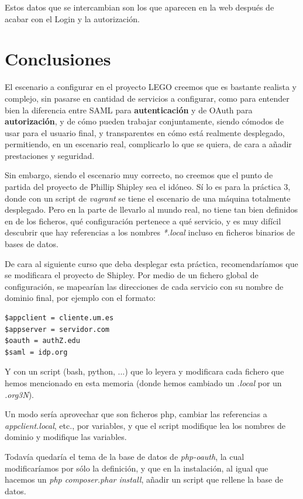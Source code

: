 \documentclass[]{article}
\begin{document}
Estos datos que se intercambian son los que aparecen en la web después de acabar con el Login y la autorización.

\section{Conclusiones}

El escenario a configurar en el proyecto LEGO creemos que es bastante realista y complejo, sin pasarse en cantidad de servicios a configurar, como para entender bien la diferencia entre SAML para \textbf{autenticación} y de OAuth para \textbf{autorización}, y de cómo pueden trabajar conjuntamente, siendo cómodos de usar para el usuario final, y transparentes en cómo está realmente desplegado, permitiendo, en un escenario real, complicarlo lo que se quiera, de cara a añadir prestaciones y seguridad.

\hfill

Sin embargo, siendo el escenario muy correcto, no creemos que el punto de partida del proyecto de Phillip Shipley sea el idóneo. Sí lo es para la práctica 3, donde con un script de \textit{vagrant} se tiene el escenario de una máquina totalmente desplegado. Pero en la parte de llevarlo al mundo real, no tiene tan bien definidos en de los ficheros, qué configuración pertenece a qué servicio, y es muy difícil descubrir que hay referencias a los nombres \textit{*.local} incluso en ficheros binarios de bases de datos.

\hfill

De cara al siguiente curso que deba desplegar esta práctica, recomendaríamos que se modificara el proyecto de Shipley. Por medio de un fichero global de configuración, se mapearían las direcciones de cada servicio con su nombre de dominio final, por ejemplo con el formato:

\begin{verbatim}
$appclient = cliente.um.es
$appserver = servidor.com
$oauth = authZ.edu
$saml = idp.org
\end{verbatim} 

Y con un script (bash, python, ...) que lo leyera y modificara cada fichero que hemos mencionado en esta memoria (donde hemos cambiado un \textit{.local} por un \textit{.org3N}).

Un modo sería aprovechar que son ficheros php, cambiar las referencias a \textit{appclient.local}, etc., por variables, y que el script modifique lea los nombres de dominio y modifique las variables.

Todavía quedaría el tema de la base de datos de \textit{php-oauth}, la cual modificaríamos por sólo la definición, y que en la instalación, al igual que hacemos un \textit{php composer.phar install}, añadir un script que rellene la base de datos.
\end{document}
